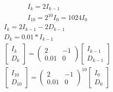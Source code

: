 \documentclass{beamer}
\begin{document}
\begin{frame}{}
  \begin{gather*}
    I_k = 2I_{k-1}\\
    I_{10} = 2^{10}I_0 = 1024I_0
  \end{gather*}
  \begin{gather*}
    I_k = 2I_{k-1} -2D_{k-1} \\
    D_k = 0.01*I_{k-1} \\
    \begin{bmatrix}
      I_k \\ D_k
    \end{bmatrix} = \begin{pmatrix}
      2 & -1 \\ 0.01 & 0
    \end{pmatrix}\begin{bmatrix}
      I_{k-1} \\ D_{k-1}
    \end{bmatrix} \\
    \begin{bmatrix}
      I_{10} \\ D_{10}
    \end{bmatrix} = \begin{pmatrix}
      2 & -1 \\ 0.01 & 0
    \end{pmatrix}^{10}\begin{bmatrix}
      I_{0} \\ D_{0}
    \end{bmatrix}
\end{gather*}

\end{frame}
\end{document}
